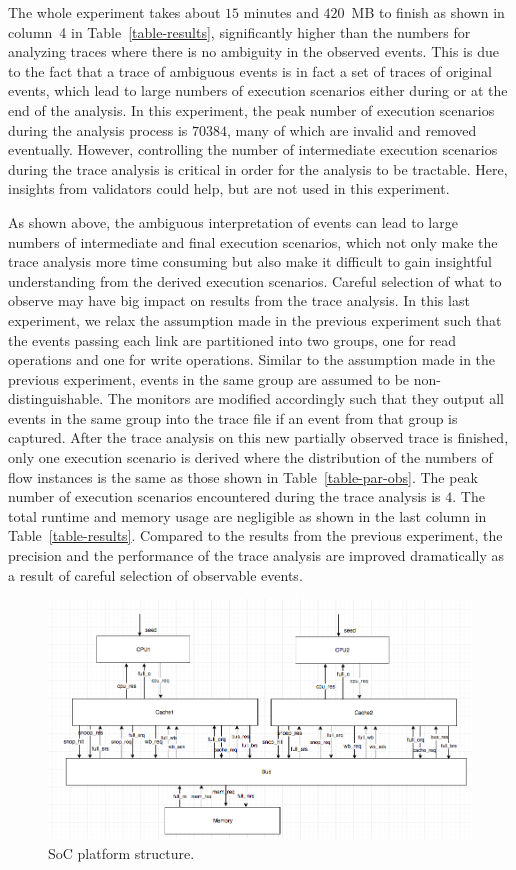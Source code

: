 \documentclass[12pt,frontmatter,copyright,thesis]{usfmanus}
\begin{document}
The whole experiment takes about $15$ minutes and $420$~MB to finish as shown in column~4
in Table~\ref{table-results}, significantly higher than the numbers for analyzing traces where there is no ambiguity in the observed events.  This is due to the fact that a trace of ambiguous events is in fact a set of traces of original events, which lead to large numbers of execution scenarios either during or at the end of the analysis.  In this experiment, the peak number of execution scenarios during the analysis process is $70384$, many of which are invalid and removed eventually.  However, controlling the number of intermediate execution scenarios during the trace analysis is critical in order for the analysis to be tractable.  Here, insights from validators could help, but are not used in this experiment.   

As shown above, the ambiguous interpretation of events can lead to large numbers of intermediate and final execution scenarios, which not only make the trace analysis more time consuming but also make it difficult to gain insightful understanding from the derived execution scenarios.  Careful selection of what to observe may have big impact on results from the trace analysis.  In this last experiment, we relax the assumption made in the previous experiment such that the events passing each link are partitioned into two groups, one for read operations and one for write operations.  Similar to the assumption made in the previous experiment, events in the same group are assumed to be non-distinguishable.  The monitors are modified accordingly such that they output all events in the same group into the trace file if an event from that group is captured.  After the trace analysis on this new partially observed trace is finished, only one execution scenario is derived where the distribution of the numbers of flow instances is the same as those shown in Table~\ref{table-par-obs}.  The peak number of execution scenarios encountered during the trace analysis is $4$.  The total runtime and memory usage are negligible as shown in the last column in Table~\ref{table-results}.  Compared to the results from the previous experiment, the precision and the performance of the trace analysis are improved dramatically as a result of careful selection of observable events. 


\begin{figure} 
\centerline{
\includegraphics[width=7in]{struc.pdf}}
\caption{SoC platform structure.}
\label{rtlstruc}
\end{figure}
\end{document}
